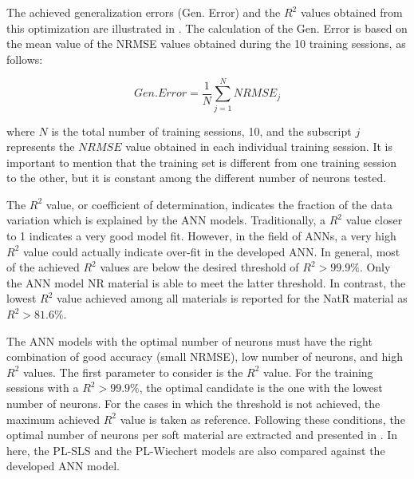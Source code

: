 The achieved generalization errors (Gen. Error) and the $R^2$ values obtained from this optimization are illustrated in . The calculation of the Gen. Error is based on the mean value of the NRMSE values obtained during the 10 training sessions, as follows:

\begin{equation}
\label{eqGenError}
Gen. Error = \frac{1}{N}\sum_{j=1}^{N} NRMSE_j
\end{equation}

\noindent where $N$ is the total number of training sessions, 10, and the subscript $j$ represents the $NRMSE$ value obtained in each individual training session. It is important to mention that the training set is different from one training session to the other, but it is constant among the different number of neurons tested.

The $R^2$ value, or coefficient of determination, indicates the fraction of the data variation which is explained by the ANN models. Traditionally, a $R^2$ value closer to 1 indicates a very good model fit. However, in the field of ANNs, a very high $R^2$ value could actually indicate over-fit in the developed ANN. In general, most of the achieved $R^2$ values are below the desired threshold of $R^2>99.9\%$. Only the ANN model NR material is able to meet the latter threshold. In contrast, the lowest $R^2$ value achieved among all materials is reported for the NatR material as $R^2>81.6\%$. 

The ANN models with the optimal number of neurons must have the right combination of good accuracy (small NRMSE), low number of neurons, and high $R^2$ values. The first parameter to consider is the $R^2$ value. For the training sessions with a $R^2 > 99.9\%$, the optimal candidate is the one with the lowest number of neurons. For the cases in which the threshold is not achieved, the maximum achieved  $R^2$ value is taken as reference. Following these conditions, the optimal number of neurons per soft material are extracted and presented in . In here, the PL-SLS and the PL-Wiechert models are also compared against the developed ANN model.

